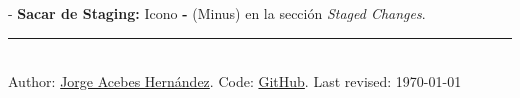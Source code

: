 - \textbf{Sacar de Staging:} Icono \textbf{-} (Minus) en la sección \textit{Staged Changes}.

\hrule
~\\
Author: \href{https://www.linkedin.com/in/jorge-acebes-hern%C3%A1ndez/}{Jorge Acebes Hernández}. Code: \href{https://github.com/JorgeAcebes/physics-cheat-sheets/tree/main/Introducci%C3%B3n%20a%20Python%20y%20Git}{GitHub}. Last revised: \today \hfill{}




